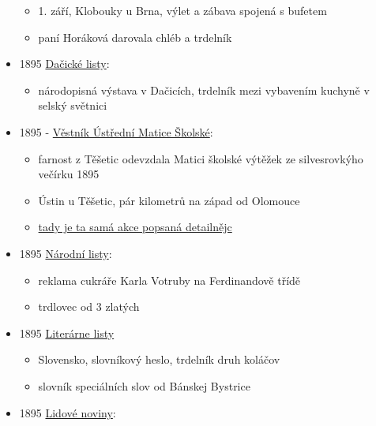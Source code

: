 \begin{itemize}
  \begin{itemize}
  \tightlist
  \item
    1. září, Klobouky u Brna, výlet a zábava spojená s bufetem
  \item
    paní Horáková darovala chléb a trdelník
  \end{itemize}
\item
  1895
  \href{https://www.digitalniknihovna.cz/vkol/uuid/uuid:a7f4aea1-a2cd-4d9f-a1fa-b43aa3c25dff}{Dačické
  listy}:

  \begin{itemize}
  \tightlist
  \item
    národopisná výstava v Dačicích, trdelník mezi vybavením kuchyně v
    selský světnici
  \end{itemize}
\item
  1895 -
  \href{https://ndk.cz/view/uuid:77d41380-a2e4-11e7-a093-005056825209?page=uuid\%3A9cb54070-a343-11e7-a093-005056825209&fulltext=trdeln\%C3\%ADk}{Věstník
  Ústřední Matice Školské}:

  \begin{itemize}
  \tightlist
  \item
    farnost z Těšetic odevzdala Matici školské výtěžek ze silvesrovkýho
    večírku 1895
  \item
    Ústin u Těšetic, pár kilometrů na západ od Olomouce
  \item
    \href{https://ndk.cz/view/uuid:eb8e3d99-435d-11dd-b505-00145e5790ea?page=uuid\%3A04295899-610e-49f5-b5b3-35f73d41b05d&fulltext=trdeln\%C3\%ADk}{tady
    je ta samá akce popsaná detailnějc}
  \end{itemize}
\item
  1895
  \href{https://ceskadigitalniknihovna.cz/uuid/uuid:6ef09ed4-435f-11dd-b505-00145e5790ea}{Národní
  listy}:

  \begin{itemize}
  \tightlist
  \item
    reklama cukráře Karla Votruby na Ferdinandově třídě
  \item
    trdlovec od 3 zlatých
  \end{itemize}
\item
  1895
  \href{https://dikda.snk.sk/uuid/uuid:dde694e6-6191-4983-bed1-e6328f0c9bf4}{Literárne
  listy}

  \begin{itemize}
  \tightlist
  \item
    Slovensko, slovníkový heslo, trdelník druh koláčov
  \item
    slovník speciálních slov od Bánskej Bystrice
  \end{itemize}
\item
  1895
  \href{https://ceskadigitalniknihovna.cz/uuid/uuid:22933190-6ef8-11ed-a5ba-005056827e51}{Lidové
  noviny}:


\end{itemize}

